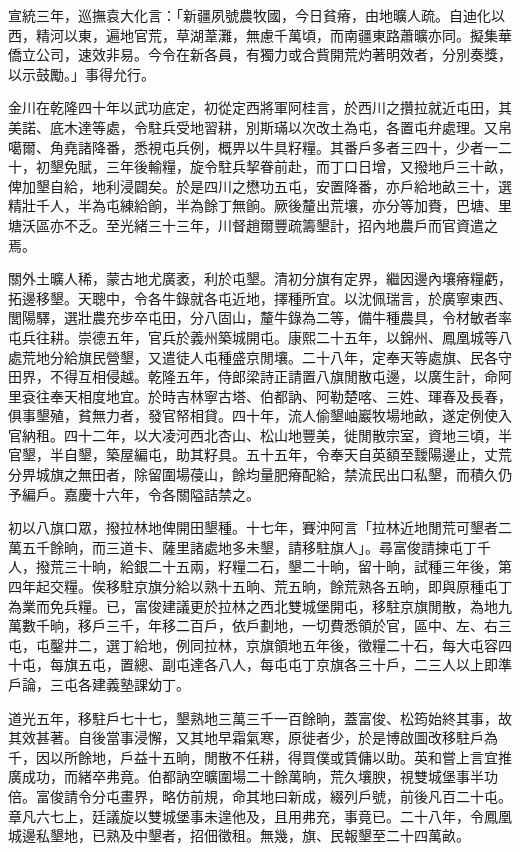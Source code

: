 \begin{pinyinscope}
宣統三年，巡撫袁大化言：「新疆夙號農牧國，今日貧瘠，由地曠人疏。自迪化以西，精河以東，遍地官荒，草湖葦灘，無慮千萬頃，而南疆東路蕭曠亦同。擬集華僑立公司，速效非易。今令在新各員，有獨力或合貲開荒灼著明效者，分別奏獎，以示鼓勵。」事得允行。

金川在乾隆四十年以武功底定，初從定西將軍阿桂言，於西川之攢拉就近屯田，其美諾、底木達等處，令駐兵受地習耕，別斯璊以次改土為屯，各置屯弁處理。又帛噶爾、角堯諸降番，悉視屯兵例，概畀以牛具籽糧。其番戶多者三四十，少者一二十，初墾免賦，三年後輸糧，旋令駐兵挈眷前赴，而丁口日增，又撥地戶三十畝，俾加墾自給，地利浸闢矣。於是四川之懋功五屯，安置降番，亦戶給地畝三十，選精壯千人，半為屯練給餉，半為餘丁無餉。厥後釐出荒壤，亦分等加賚，巴塘、里塘沃區亦不乏。至光緒三十三年，川督趙爾豐疏籌墾計，招內地農戶而官資遣之焉。

關外土曠人稀，蒙古地尤廣袤，利於屯墾。清初分旗有定界，繼因邊內壤瘠糧虧，拓邊移墾。天聰中，令各牛錄就各屯近地，擇種所宜。以沈佩瑞言，於廣寧東西、閭陽驛，選壯農充步卒屯田，分八固山，釐牛錄為二等，備牛種農具，令材敏者率屯兵往耕。崇德五年，官兵於義州築城開屯。康熙二十五年，以錦州、鳳凰城等八處荒地分給旗民營墾，又遣徒人屯種盛京閒壤。二十八年，定奉天等處旗、民各守田界，不得互相侵越。乾隆五年，侍郎梁詩正請置八旗閒散屯邊，以廣生計，命阿里袞往奉天相度地宜。於時吉林寧古塔、伯都訥、阿勒楚喀、三姓、琿春及長春，俱事墾殖，貧無力者，發官帑相貸。四十年，流人偷墾岫巖牧場地畝，遂定例使入官納租。四十二年，以大凌河西北杏山、松山地豐美，徙閒散宗室，資地三頃，半官墾，半自墾，築屋編屯，助其籽具。五十五年，令奉天自英額至靉陽邊止，丈荒分畀城旗之無田者，除留圍場葠山，餘均量肥瘠配給，禁流民出口私墾，而積久仍予編戶。嘉慶十六年，令各關隘詰禁之。

初以八旗口眾，撥拉林地俾開田墾種。十七年，賽沖阿言「拉林近地閒荒可墾者二萬五千餘晌，而三道卡、薩里諸處地多未墾，請移駐旗人」。尋富俊請揀屯丁千人，撥荒三十晌，給銀二十五兩，籽糧二石，墾二十晌，留十晌，試種三年後，第四年起交糧。俟移駐京旗分給以熟十五晌、荒五晌，餘荒熟各五晌，即與原種屯丁為業而免兵糧。已，富俊建議更於拉林之西北雙城堡開屯，移駐京旗閒散，為地九萬數千晌，移戶三千，年移二百戶，依戶劃地，一切費悉領於官，區中、左、右三屯，屯鑿井二，選丁給地，例同拉林，京旗領地五年後，徵糧二十石，每大屯容四十屯，每旗五屯，置總、副屯達各八人，每屯屯丁京旗各三十戶，二三人以上即準戶論，三屯各建義塾課幼丁。

道光五年，移駐戶七十七，墾熟地三萬三千一百餘晌，蓋富俊、松筠始終其事，故其效甚著。自後當事浸懈，又其地早霜氣寒，原徙者少，於是博啟圖改移駐戶為千，因以所餘地，戶益十五晌，閒散不任耕，得買僕或賃傭以助。英和嘗上言宜推廣成功，而緒卒弗竟。伯都訥空曠圍場二十餘萬晌，荒久壤腴，視雙城堡事半功倍。富俊請令分屯畫界，略仿前規，命其地曰新成，綴列戶號，前後凡百二十屯。章凡六七上，廷議旋以雙城堡事未遑他及，且用弗充，事竟已。二十八年，令鳳凰城邊私墾地，已熟及中墾者，招佃徵租。無幾，旗、民報墾至二十四萬畝。


\end{pinyinscope}
